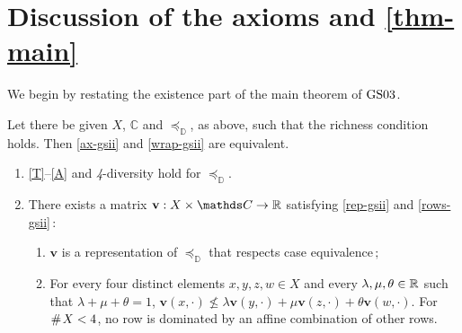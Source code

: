 \documentclass[12pt,a4paper,twoside]{article}
\newcommand{\gsii}{$\textup{GS03}$}
\newcommand{\preceqb}{\mathbin{\preceq}}
\newcommand{\countof}{\mathbin{\#}\hskip1pt}
\newcommand{\mbbd}{{\mathds D}}
\newcommand{\mbbc}{{\mathds C}}
\newcommand{\fourdiv}{\textit{4}-\textup{diversity}}
\begin{document}


\section{Discussion of the axioms and \cref{thm-main}}\label{sec-discussion} We
begin by restating the existence part of the main theorem of \gsii.
\begin{theorem*}[\gsii, existence]\label{thm-gsii}
  Let there be given $X$, $\mbbc$ and $\preceqb_ \mbbd$, as above, such that
  the richness condition holds. Then \ref{ax-gsii} and \ref{wrap-gsii} are
  equivalent.

\begin{enumerate}[label=\textup{(\roman*)}]

\item\label{ax-gsii}

  \textup{\ref{T}--\ref{A}} and \textup{\fourdiv} hold for $\preceq_{\mbbd}$.

\item\label{wrap-gsii} There exists a matrix
  $\mathbf{v} : X \times \mbbc \rightarrow \R$ satisfying \ref{rep-gsii} and \ref{rows-gsii}$\,:$
  \begin{enumerate}[label=\textup{(\alph*)}]
  \item\label{rep-gsii}
  $\mathbf{v}$ is a representation of $\preceq _ { \mbbd }$ that respects case equivalence$\,;$

\item\label{rows-gsii} For every four distinct elements $x,y,z,w \in X$ and
  every $\lambda , \mu, \theta \in \mathbb R$ such that $\lambda +\mu + \theta = 1$,
      $\mathbf{v}(x,\cdot ) \not \leq \lambda \mathbf{v}(y,\cdot )+\mu
      \mathbf{v}(z,\cdot)+ \theta \mathbf{v}(w,\cdot)$.  For $\countof X < 4$,
      no row is dominated by an affine combination of other rows.
\end{enumerate} 

\end{enumerate}
\end{theorem*}
\end{document}
